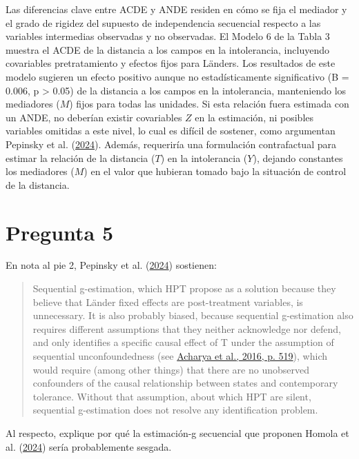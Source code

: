 \documentclass[
  12pt,
  a4paper,
]{article}
\begin{document}
Las diferencias clave entre ACDE y ANDE residen en cómo se fija el mediador y el grado de rigidez del supuesto de independencia secuencial respecto a las variables intermedias observadas y no observadas. El Modelo 6 de la Tabla 3 muestra el ACDE de la distancia a los campos en la intolerancia, incluyendo covariables pretratamiento y efectos fijos para Länders. Los resultados de este modelo sugieren un efecto positivo aunque no estadísticamente significativo (B = 0.006, p \textgreater{} 0.05) de la distancia a los campos en la intolerancia, manteniendo los mediadores (\(M\)) fijos para todas las unidades. Si esta relación fuera estimada con un ANDE, no deberían existir covariables \(Z\) en la estimación, ni posibles variables omitidas a este nivel, lo cual es difícil de sostener, como argumentan Pepinsky et al. (\protect\hyperlink{ref-pepinsky_causation_2024}{2024}). Además, requeriría una formulación contrafactual para estimar la relación de la distancia (\(T\)) en la intolerancia (\(Y\)), dejando constantes los mediadores (\(M\)) en el valor que hubieran tomado bajo la situación de control de la distancia.

\hypertarget{pregunta-5}{%
\section{Pregunta 5}\label{pregunta-5}}

En nota al pie 2, Pepinsky et al. (\protect\hyperlink{ref-pepinsky_causation_2024}{2024}) sostienen:

\begin{quote}
Sequential g-estimation, which HPT propose as a solution because they believe that Länder fixed effects are post-treatment variables, is unnecessary. It is also probably biased, because sequential g-estimation also requires different assumptions that they neither acknowledge nor defend, and only identifies a specific causal effect of T under the assumption of sequential unconfoundedness (see \protect\hyperlink{ref-acharya_explaining_2016}{Acharya et al., 2016, p. 519}), which would require (among other things) that there are no unobserved confounders of the causal relationship between states and contemporary tolerance. Without that assumption, about which HPT are silent, sequential g-estimation does not resolve any identification problem.
\end{quote}

Al respecto, explique por qué la estimación-g secuencial que proponen Homola et al. (\protect\hyperlink{ref-homola_fixed_2024}{2024}) sería probablemente sesgada.
\end{document}
